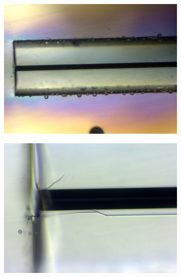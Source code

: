 \begin{figure}[h]
\centering
\begin{subfigure}{.7\textwidth}
  \centering
  \includegraphics[width=\linewidth]{fig/polishing/parallelcrack.jpg}
  \label{fig:sfig1}
\end{subfigure}%

\begin{subfigure}{.7\textwidth}
  \centering
  \includegraphics[width=\linewidth]{fig/polishing/parallelcrack2.jpg}
  \label{fig:sfig2}
\end{subfigure}%


\end{figure}
